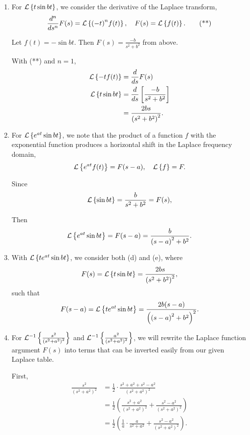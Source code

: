\documentclass[../hw7]{subfiles}
\begin{document}
\begin{enumerate}[label= (\alph*)]
    \item For $\mathcal{L}\left\{t\sin{bt}\right\}$, we consider the derivative of the Laplace transform, \[\frac{d^n}{ds^n}F(s)=\mathcal{L}\left\{{(-t)}^n f(t)\right\}, \quad F(s)=\mathcal{L}\left\{f(t)\right\}. \tag{**} \]

    Let $f(t)=-\sin{bt}$. Then $F(s)=\frac{-b}{s^2+b^2}$ from above.

    With (**) and $n=1$,
    \begin{align*}
        \mathcal{L}\left\{-t f(t)\right\}&=\frac{d}{ds}F(s) \\
        \mathcal{L}\left\{t\sin{bt}\right\} &= \frac{d}{ds}\left[ \frac{-b}{s^2+b^2} \right] \\
        &= \frac{2bs}{{(s^2+b^2)}^2}. \\
    \end{align*}

    \item For $\mathcal{L}\left\{e^{at}\sin{bt}\right\}$, we note that the product of a function $f$ with the exponential function produces a horizontal shift in the Laplace frequency domain, \[\mathcal{L}\left\{e^{at}f(t)\right\}=F(s-a), \quad \mathcal{L}\left\{f\right\}=F.\]
    
    Since \[\mathcal{L}\left\{\sin{bt}\right\}=\frac{b}{s^2+b^2}=F(s),\]

    Then \[\mathcal{L}\left\{e^{at}\sin{bt}\right\}=F(s-a)=\frac{b}{{(s-a)}^2+b^2}.\]

    \item With $\mathcal{L}\left\{te^{at}\sin{bt}\right\}$, we consider both (d) and (e), where \[F(s)=\mathcal{L}\left\{t\sin{bt}\right\}=\frac{2bs}{{(s^2+b^2)}^2},\] such that \[F(s-a)=\mathcal{L}\left\{te^{at}\sin{bt}\right\}=\frac{2b(s-a)}{{\left( {(s-a)}^2+b^2 \right)}^2}.\]
    
    \item For $\mathcal{L}^{-1}\left\{\frac{s^2}{{\left( s^2+a^2 \right)}^2}\right\}$ and $\mathcal{L}^{-1}\left\{\frac{a^2}{{\left( s^2+a^2 \right)}^2}\right\}$, we will rewrite the Laplace function argument $F(s)$ into terms that can be inverted easily from our given Laplace table.
    
    First,
    \begin{align*}
        \frac{s^2}{{\left( s^2+a^2 \right)}^2}&=\frac{1}{2}\cdot\frac{s^2+a^2+s^2-a^2}{{\left( s^2+a^2 \right)}^2}\\
        &=\frac{1}{2}\left( \frac{s^2+a^2}{{\left( s^2+a^2 \right)}^2} +\frac{s^2-a^2}{{\left( s^2+a^2 \right)}^2}\right)\\
        &=\frac{1}{2}\left( \frac{1}{a}\cdot\frac{a}{s^2+a^2}+\frac{s^2-a^2}{{\left( s^2+a^2 \right)}^2} \right). \\
    \end{align*}


\end{enumerate}
\end{document}
